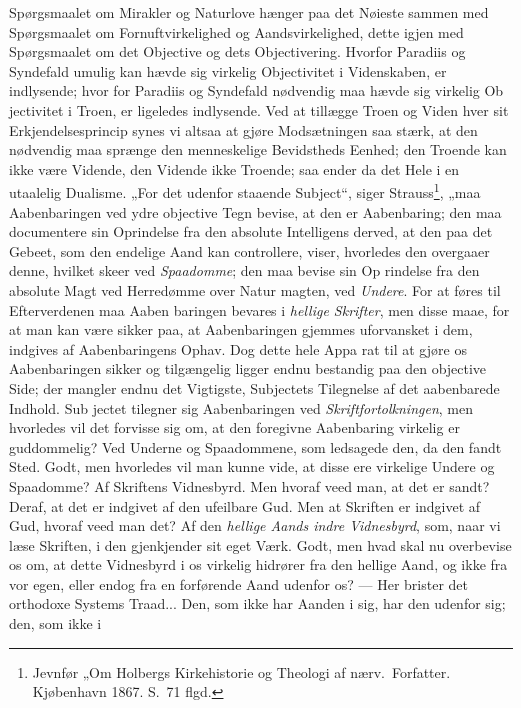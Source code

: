 \documentclass[12pt,a4paper]{article}
\newcommand{\opage}[1]{\marginnote{\footnotesize\textit{[#1]}}}
\begin{document}
Spørgsmaalet om Mirakler og Naturlove hænger paa det
Nøieste sammen med Spørgsmaalet om Fornuftvirkelighed og
Aandsvirkelighed, dette igjen med Spørgsmaalet om det Objective
og dets Objectivering. Hvorfor Paradiis og Syndefald umulig kan
hævde sig virkelig Objectivitet i Videnskaben, er indlysende; hvor\-%
for Paradiis og Syndefald nødvendig maa hævde sig virkelig Ob\-%
jectivitet i Troen, er ligeledes indlysende. Ved at tillægge Troen
og Viden hver sit Erkjendelsesprincip synes vi altsaa at gjøre
Modsætningen saa stærk, at den nødvendig maa sprænge den
menneskelige Bevidstheds Eenhed; den Troende kan ikke være
Vidende, den Vidende ikke Troende; saa ender da det Hele i en
utaalelig Dualisme. „For det udenfor staaende Subject“, siger
Strauss\footnote{Jevnfør „Om Holbergs Kirkehistorie og Theologi af nærv.\ Forfatter.
Kjøbenhavn 1867. S.\ 71 flgd.}, %
„maa Aabenbaringen ved ydre objective Tegn bevise,
at den er Aabenbaring; den maa documentere sin Oprindelse fra
den absolute Intelligens derved, at den paa det Gebeet, som den
endelige Aand kan controllere, viser, hvorledes den overgaaer
denne, hvilket skeer ved \emph{Spaadomme}; den maa bevise sin Op\-%
rindelse fra den absolute Magt ved Herredømme over Natur\-%
magten, ved \emph{Undere}. For at føres til Efterverdenen maa Aaben\-%
baringen bevares i \emph{hellige Skrifter}, men disse maae, for at
man kan være sikker paa, at Aabenbaringen gjemmes uforvansket
i dem, indgives af Aabenbaringens Ophav. Dog dette hele Appa\-%
rat til at gjøre os Aabenbaringen sikker og tilgængelig ligger
endnu bestandig paa den objective Side; der mangler endnu det
Vigtigste, Subjectets Tilegnelse af det aabenbarede Indhold. Sub\-%
jectet tilegner sig Aabenbaringen ved \emph{Skriftfortolkningen},
men hvorledes vil det forvisse sig om, at den foregivne Aabenbaring
virkelig er guddommelig? Ved Underne og Spaadommene, som
ledsagede den, da den fandt Sted. Godt, men hvorledes vil man
\opage{47}kunne vide, at disse ere virkelige Undere og Spaadomme? Af
Skriftens Vidnesbyrd. Men hvoraf veed man, at det er sandt?
Deraf, at det er indgivet af den ufeilbare Gud. Men at Skriften
er indgivet af Gud, hvoraf veed man det? Af den \emph{hellige
Aands indre Vidnesbyrd}, som, naar vi læse Skriften, i den
gjenkjender sit eget Værk. Godt, men hvad skal nu overbevise
os om, at dette Vidnesbyrd i os virkelig hidrører fra den hellige
Aand, og ikke fra vor egen, eller endog fra en forførende Aand
udenfor os? --- Her brister det orthodoxe Systems Traad... Den,
som ikke har Aanden i sig, har den udenfor sig; den, som ikke i
\end{document}
